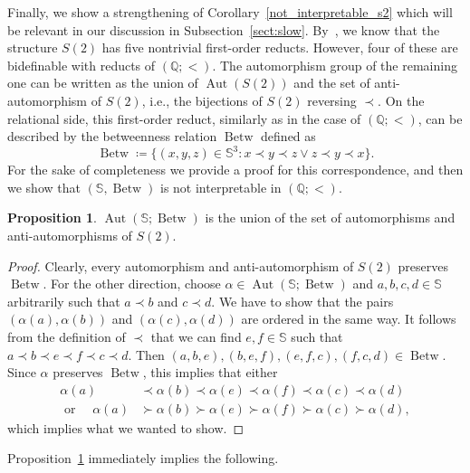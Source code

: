 \documentclass{amsart}
\theoremstyle{definition}
\newtheorem{proposition}[theorem]{Proposition}
\theoremstyle{remark}
\numberwithin{equation}{section}
\newcommand{\aut}{\operatorname{Aut}}
\newcommand{\betw}{\operatorname{Betw}}
\newcommand{\cc}{\mathbb{S}}
\begin{document}
	Finally, we show a strengthening of Corollary~\ref{not_interpretable_s2} which will be relevant in our discussion in Subsection~\ref{sect:slow}.
	By~\cite[Section 9]{Bennett-thesis}, we know that the structure $S(2)$ has five nontrivial first-order reducts. However, four of these are bidefinable with reducts of $(\mathbb{Q};<)$. The automorphism group of the remaining one can be written as the union of $\aut(S(2))$ and the set of anti-automorphism of $S(2)$, i.e., the bijections of $S(2)$ reversing $\prec$. On the relational side, this first-order reduct, similarly as in the case of $(\mathbb{Q};<)$, can be described by the betweenness relation $\betw$ defined as
$$\betw\coloneqq \{(x,y,z)\in \cc^3: x\prec y\prec z\vee z\prec y\prec x\}.$$
	For the sake of completeness we provide a proof for this correspondence, and then we show that $(\cc,\betw)$ is not interpretable in $(\mathbb{Q};<)$.
	
\begin{proposition}\label{s2betw}
	$\aut(\cc;\betw)$ is the union of the set of automorphisms and anti-automorphisms of $S(2)$.
\end{proposition}

\begin{proof}
	Clearly, every automorphism and anti-automorphism of $S(2)$ preserves $\betw$. 
    For the other direction, choose $\alpha\in \aut(\cc;\betw)$ and 
    $a,b,c,d \in \cc$ arbitrarily such that $a \prec b$ and $c \prec d$. We have to show that the pairs $(\alpha(a),\alpha(b))$ and $(\alpha(c),\alpha(d))$ are ordered in the same way. It follows from the definition of $\prec$ that we can find $e,f\in \cc$ such that $a\prec b\prec e\prec f\prec c\prec d$. Then $(a,b,e),(b,e,f),(e,f,c),(f,c,d)\in \betw$. Since $\alpha$ preserves $\betw$, this implies that either \begin{align*}
        \alpha(a) & \prec \alpha(b)\prec \alpha(e)\prec \alpha(f)\prec \alpha(c)\prec \alpha(d) \\
        \text{ or } \quad \alpha(a) & \succ \alpha(b)\succ \alpha(e)\succ \alpha(f)\succ \alpha(c)\succ \alpha(d),
    \end{align*} 
        which implies what we wanted to show.
\end{proof}

	Proposition~\ref{s2betw} immediately implies the following.
	
\end{document}
